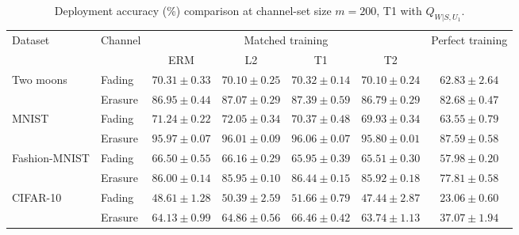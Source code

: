 \begin{table}[htb]
\centering
\caption{Deployment accuracy (\%) comparison at channel-set size $m=200$, T1 with $Q_{W|S,U_1}$.}
\label{tab:performance}
\begin{tabular*}{\linewidth}{@{\extracolsep{\fill}}llccccc@{}}
\toprule
\multirow{2}{*}{Dataset} & \multirow{2}{*}{Channel}
& \multicolumn{4}{c}{Matched training} & \multirow{2}{*}{Perfect training} \\
\cmidrule(lr){3-6}
& & ERM & L2 & T1 & T2 &  \\
\midrule
\multirow{2}{*}{Two moons}
& Fading
& $70.31\pm0.33$ & $70.10\pm0.25$ & $\mathbf{70.32}\pm0.14$ & $70.10\pm0.24$ & $62.83\pm2.64$ \\
& Erasure
& $86.95\pm0.44$ & $87.07\pm0.29$ & $\mathbf{87.39}\pm0.59$ & $86.79\pm0.29$ & $82.68\pm0.47$ \\
\midrule
\multirow{2}{*}{MNIST}
& Fading
& $71.24\pm0.22$ & $\mathbf{72.05}\pm0.34$ & $70.37\pm0.48$ & $69.93\pm0.34$ & $63.55\pm0.79$ \\
& Erasure
& $95.97\pm0.07$ & $96.01\pm0.09$ & $\mathbf{96.06}\pm0.07$ & $95.80\pm0.01$ & $87.59\pm0.58$ \\
\midrule
\multirow{2}{*}{Fashion-MNIST}
& Fading
& $\mathbf{66.50}\pm0.55$ & $66.16\pm0.29$ & $65.95\pm0.39$ & $65.51\pm0.30$ & $57.98\pm0.20$ \\
& Erasure
& $86.00\pm0.14$ & $85.95\pm0.10$ & $\mathbf{86.44}\pm0.15$ & $85.92\pm0.18$ & $77.81\pm0.58$ \\
\midrule
\multirow{2}{*}{CIFAR-10}
& Fading
& $48.61\pm1.28$ & $50.39\pm2.59$ & $\mathbf{51.66}\pm0.79$ & $47.44\pm2.87$ & $23.06\pm0.60$ \\
& Erasure
& $64.13\pm0.99$ & $64.86\pm0.56$ & $\mathbf{66.46}\pm0.42$ & $63.74\pm1.13$ & $37.07\pm1.94$ \\
\bottomrule
\end{tabular*}
\end{table}
